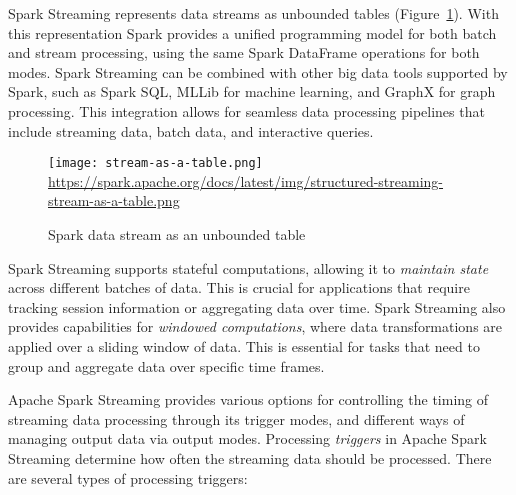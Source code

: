 Spark Streaming represents data streams as unbounded tables (Figure~\ref{fig:sparkstreamtable}). With this representation Spark provides a unified programming model for both batch and stream processing, using the same Spark DataFrame operations for both modes. Spark Streaming can be combined with other big data tools supported by Spark, such as Spark SQL, MLLib for machine learning, and GraphX for graph processing. This integration allows for seamless data processing pipelines that include streaming data, batch data, and interactive queries.

\begin{figure}
\centering

\texttt{[image: stream-as-a-table.png]} \\

\scriptsize\url{https://spark.apache.org/docs/latest/img/structured-streaming-stream-as-a-table.png}
\caption{Spark data stream as an unbounded table}
\label{fig:sparkstreamtable}
\end{figure}

Spark Streaming supports stateful computations, allowing it to \emph{maintain state} across different batches of data. This is crucial for applications that require tracking session information or aggregating data over time. Spark Streaming also provides capabilities for \emph{windowed computations}, where data transformations are applied over a sliding window of data. This is essential for tasks that need to group and aggregate data over specific time frames.

Apache Spark Streaming provides various options for controlling the timing of streaming data processing through its trigger modes, and different ways of managing output data via output modes. Processing \emph{triggers} in Apache Spark Streaming determine how often the streaming data should be processed. There are several types of processing triggers:

